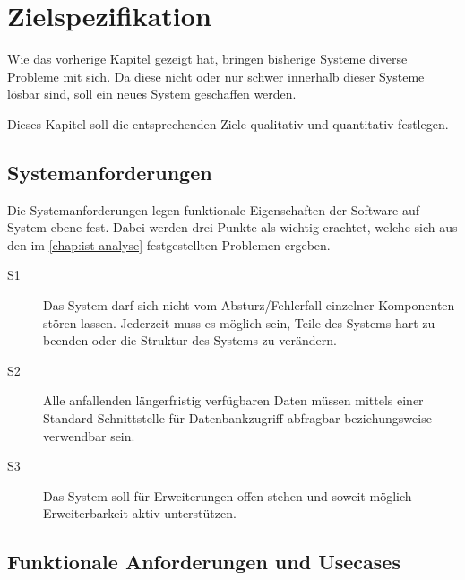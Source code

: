 \chapter{Zielspezifikation}
\label{chap:target}
Wie das vorherige Kapitel gezeigt hat,
bringen bisherige Systeme diverse Probleme mit sich.
Da diese nicht oder nur schwer innerhalb dieser Systeme lösbar sind,
soll ein neues System geschaffen werden.

Dieses Kapitel soll die entsprechenden Ziele
qualitativ und quantitativ festlegen.






\section{Systemanforderungen}
\label{sec:target:systemanforderungen}

Die Systemanforderungen legen funktionale Eigenschaften der Software auf System-ebene fest.
Dabei werden drei Punkte als wichtig erachtet, welche sich aus den im \cref{chap:ist-analyse} festgestellten Problemen ergeben.


\begin{description}

\item[S1]
  Das System darf sich nicht vom Absturz/Fehlerfall
  einzelner Komponenten stören lassen. Jederzeit muss
  es möglich sein, Teile des Systems hart zu beenden
  oder die Struktur des Systems zu verändern.

\item[S2]
  Alle anfallenden längerfristig verfügbaren Daten müssen
  mittels einer Standard-Schnittstelle für
  Datenbankzugriff abfragbar beziehungsweise verwendbar sein.

\item[S3]
  Das System soll für Erweiterungen offen stehen
  und soweit möglich Erweiterbarkeit aktiv unterstützen.
\end{description}


\section{Funktionale Anforderungen und Usecases}
\label{sec:target:usecases}

